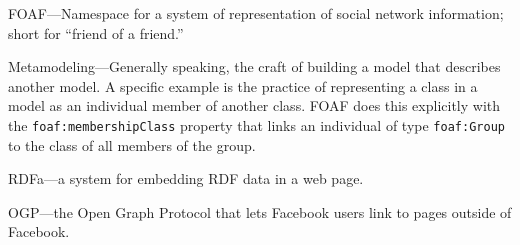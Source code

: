 FOAF---Namespace for a system of representation of social network
information; short for ``friend of a friend.''

Metamodeling---Generally speaking, the craft of building a model that
describes another model. A specific example is the practice of
representing a class in a model as an individual member of another
class. FOAF does this explicitly with the \texttt{foaf:membershipClass} property
that links an individual of type \texttt{foaf:Group} to the class of all members
of the group.

RDFa---a system for embedding RDF data in a web page.

OGP---the Open Graph Protocol that lets Facebook users link to pages
outside of Facebook.
